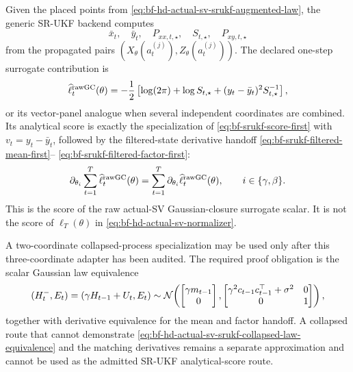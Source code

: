 Given the placed points from
\eqref{eq:bf-hd-actual-sv-srukf-augmented-law}, the generic SR-UKF backend
computes
\begin{equation}
  \bar x_t,\quad \bar y_t,\quad
  P_{xx,t,\star},\quad S_{t,\star},\quad P_{xy,t,\star}
\end{equation}
from the propagated pairs
\((X_\theta(a_t^{(j)}),Z_\theta(a_t^{(j)}))\).  The declared one-step
surrogate contribution is
\begin{equation}
  \widehat\ell_t^{\rm rawGC}(\theta)
  =
  -\frac12
  \left[
    \log(2\pi)+\log S_{t,\star}
    +(y_t-\bar y_t)^2S_{t,\star}^{-1}
  \right],
  \label{eq:bf-hd-actual-sv-srukf-surrogate-loglik}
\end{equation}
or its vector-panel analogue when several independent coordinates are combined.
Its analytical score is exactly the specialization of
\eqref{eq:bf-srukf-score-first} with \(v_t=y_t-\bar y_t\), followed by the
filtered-state derivative handoff
\eqref{eq:bf-srukf-filtered-mean-first}--
\eqref{eq:bf-srukf-filtered-factor-first}:
\begin{equation}
  \partial_{\theta_i}
  \sum_{t=1}^T\widehat\ell_t^{\rm rawGC}(\theta)
  =
  \sum_{t=1}^T
  \partial_{\theta_i}
  \widehat\ell_t^{\rm rawGC}(\theta),
  \qquad i\in\{\gamma,\beta\}.
  \label{eq:bf-hd-actual-sv-srukf-score-handoff}
\end{equation}
This is the score of the raw actual-SV Gaussian-closure surrogate scalar.  It
is not the score of \(\ell_T(\theta)\) in
\eqref{eq:bf-hd-actual-sv-normalizer}.

A two-coordinate collapsed-process specialization may be used only after this
three-coordinate adapter has been audited.  The required proof obligation is
the scalar Gaussian law equivalence
\begin{equation}
  (H_t^-,E_t)
  =
  (\gamma H_{t-1}+U_t,E_t)
  \sim
  \mathcal{N}\!\left(
    \begin{bmatrix}\gamma m_{t-1}\\0\end{bmatrix},
    \begin{bmatrix}
      \gamma^2 c_{t-1}c_{t-1}^\top+\sigma^2 & 0\\
      0 & 1
    \end{bmatrix}
  \right),
  \label{eq:bf-hd-actual-sv-srukf-collapsed-law-equivalence}
\end{equation}
together with derivative equivalence for the mean and factor handoff.  A
collapsed route that cannot demonstrate
\eqref{eq:bf-hd-actual-sv-srukf-collapsed-law-equivalence} and the matching
derivatives remains a separate approximation and cannot be used as the admitted
SR-UKF analytical-score route.

